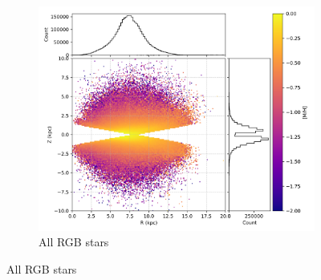 \documentclass[a4paper,12pt]{article}
\begin{document}
\begin{figure}[H]
  \centering
  \begin{subfigure}{0.6\textwidth}
    \centering
    \includegraphics[width=\textwidth]{../figures/vis_rz_metallicity_all.png}
    \caption{All RGB stars}
    \label{fig:rz_all}
  \end{subfigure}

  \vspace{0.8em}


\end{figure}
\end{document}
